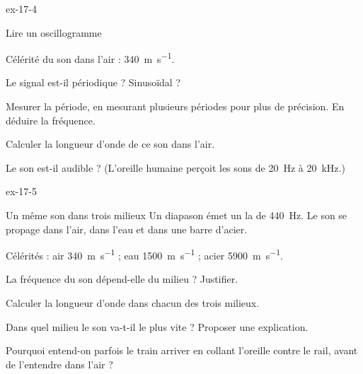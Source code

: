 \begin{blocLivre}{ex-17-4}
\begin{exercice}[1]{Lire un oscillogramme}
\begin{donnees}
Célérité du son dans l'air : \qty{340}{m.s^{-1}}.
\end{donnees}
\begin{questions}
\item Le signal est-il périodique ? Sinusoïdal ?
\item Mesurer la période, en mesurant plusieurs périodes pour plus de précision. En déduire la fréquence.
\item Calculer la longueur d'onde de ce son dans l'air.
\item Le son est-il audible ? (L'oreille humaine perçoit les sons de \qty{20}{Hz} à \qty{20}{kHz}.)
\end{questions}
\end{exercice}
\end{blocLivre}
\begin{blocLivre}{ex-17-5}
\begin{exercice}[1]{Un même son dans trois milieux}
Un diapason émet un la de \qty{440}{Hz}. Le son se propage dans l'air, dans l'eau et dans une barre d'acier.
\begin{donnees}
Célérités : air \qty{340}{m.s^{-1}} ; eau \qty{1500}{m.s^{-1}} ; acier \qty{5900}{m.s^{-1}}.
\end{donnees}
\begin{questions}
\item La fréquence du son dépend-elle du milieu ? Justifier.
\item Calculer la longueur d'onde dans chacun des trois milieux.
\item Dans quel milieu le son va-t-il le plus vite ? Proposer une explication.
\item Pourquoi entend-on parfois le train arriver en collant l'oreille contre le rail, avant de l'entendre dans l'air ?
\end{questions}
\end{exercice}
\end{blocLivre}
